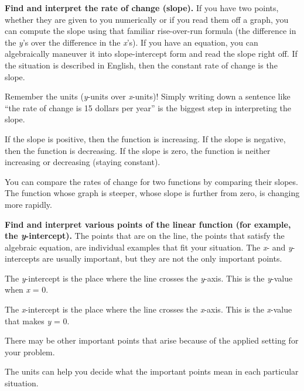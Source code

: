 \textbf{Find and interpret the rate of change (slope).} If you have two
points, whether they are given to you numerically or if you read them
off a graph, you can compute the slope using that familiar rise-over-run
formula (the difference in the \emph{y}'s over the difference in the
\emph{x}'s). If you have an equation, you can algebraically maneuver it
into slope-intercept form and read the slope right off. If the situation
is described in English, then the constant rate of change is the slope.

Remember the units (\emph{y}-units over \emph{x}-units)! Simply writing
down a sentence like ``the rate of change is 15 dollars per year'' is
the biggest step in interpreting the slope.

If the slope is positive, then the function is increasing. If the slope
is negative, then the function is decreasing. If the slope is zero, the
function is neither increasing or decreasing (staying constant).

You can compare the rates of change for two functions by comparing their
slopes. The function whose graph is steeper, whose slope is further from
zero, is changing more rapidly.

\textbf{Find and interpret various points of the linear function (for
example, the \emph{y}-intercept).} The points that are on the line, the
points that satisfy the algebraic equation, are individual examples that
fit your situation. The \emph{x}- and \emph{y}-intercepts are usually
important, but they are not the only important points.

The \emph{y}-intercept is the place where the line crosses the
\emph{y}-axis. This is the \emph{y}-value when \emph{x} = 0.

The \emph{x}-intercept is the place where the line crosses the
\emph{x}-axis. This is the \emph{x}-value that makes \emph{y} = 0.

There may be other important points that arise because of the applied
setting for your problem.

The units can help you decide what the important points mean in each
particular situation.

